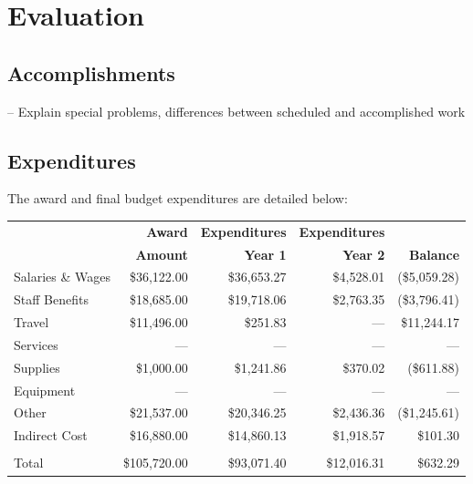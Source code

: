 \documentclass[letterpaper,12pt]{article}
\begin{document}

\section{Evaluation}

\subsection{Accomplishments}

– Explain special problems, differences between scheduled and accomplished work

\subsection{Expenditures}

The award and final budget expenditures are detailed below:

\begin{tabularx}{0.9\textwidth}{X|rrrr}
    & \textbf{Award} & \textbf{Expenditures} & \textbf{Expenditures} &  \\
    & \textbf{Amount} & \textbf{Year 1} & \textbf{Year 2} & \textbf{Balance} \\
    \hline\hline
    Salaries \& Wages & \$36,122.00 & \$36,653.27 & \$4,528.01 & (\$5,059.28) \\
    Staff Benefits & \$18,685.00 & \$19,718.06 & \$2,763.35 & (\$3,796.41) \\
    Travel & \$11,496.00 & \$251.83 & --- & \$11,244.17 \\
    Services & --- & --- & --- & --- \\
    Supplies & \$1,000.00 & \$1,241.86 & \$370.02 & (\$611.88) \\
    Equipment & --- & --- & --- & --- \\
    Other & \$21,537.00 & \$20,346.25 & \$2,436.36 & (\$1,245.61) \\
    Indirect Cost & \$16,880.00 & \$14,860.13 & \$1,918.57 & \$101.30 \\
     \\
    Total & \$105,720.00 & \$93,071.40 & \$12,016.31 & \$632.29 
\end{tabularx}
\end{document}

